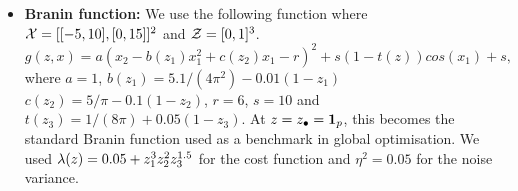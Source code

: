 \begin{itemize}[leftmargin=0.0in]
\item[]
\textbf{Branin function:}
We use the following function where $\mathcal{X}=[[-5, 10], [0, 15]]^2$ and $\mathcal{Z}=[0,1]^3$.
\[
g(z,x) = a(x_2 - b(z_1)x_1^2 + c(z_2)x_1 - r)^2 + s(1-t(z))cos(x_1) + s,
\]
where $a = 1$, $b(z_1)=5.1/(4\pi^2) - 0.01(1-z_1)$
$c(z_2) = 5/\pi - 0.1(1-z_2)$, $r=6$, $s=10$ and $t(z_3)=1/(8\pi) + 0.05(1-z_3)$.
At $z=z_{\bullet} = {\bf 1}_p$, this becomes the standard Branin function used as a benchmark in
global optimisation.
We used $\lambda(z) = 0.05 + z_1^{3}z_2^{2}z_3^{1.5}$ for the cost function and
$\eta^2=0.05$ for the noise variance.


\end{itemize}




